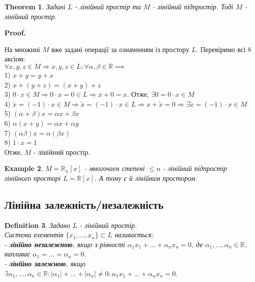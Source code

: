 \documentclass[a4paper, 10pt]{article}
\makeatletter
\def\qed{$\blacksquare$}
\theoremstyle{theoremdd}
\newtheorem{theorem}{Theorem}[subsection]
\theoremstyle{theoremdd}
\newtheorem{definition}[theorem]{Definition}
\theoremstyle{theoremdd}
\theoremstyle{theoremdd}
\newtheorem{example}[theorem]{Example}
\theoremstyle{theoremdd}
\theoremstyle{theoremdd}
\theoremstyle{theoremdd}
\theoremstyle{theoremdd}
\renewenvironment{proof}[1][Proof.\\]{\par
\pushQED{\hfill \qed}%
\normalfont \topsep6\p@\@plus6\p@\relax
\trivlist
\item\relax
{\bfseries
#1\@addpunct{.}}\hspace\labelsep\ignorespaces
}{%
\popQED\endtrivlist\@endpefalse
}
\makeatother
\begin{document}
	\begin{theorem}
	Задані $L$ - лінійний простір та $M$ - лінійний підпростір. Тоді $M$ - лінійний простір.
	\end{theorem}
	
	\begin{proof}
	На множині $M$ вже задані операції за означенням із простору $L$. Перевіримо всі 8 аксіом: \\ $\forall x,y,z \in M \Rightarrow x,y,z \in L: \forall \alpha, \beta \in \mathbb{R} \implies$\\
	1) $x+y=y+x$\\
	2) $x+(y+z)=(x+y)+z$\\
	3) $0\cdot x \in M \Rightarrow 0 \cdot x = 0 \in L \Rightarrow x + 0 = x$. Отже, $\exists 0 = 0 \cdot x \in M$\\
	4) $\tilde{x} = (-1)\cdot x \in M \Rightarrow \tilde{x} = (-1)\cdot x \in L \Rightarrow x + \tilde{x} = 0 \Rightarrow \exists \tilde{x} = (-1)\cdot x \in M$\\
	5) $(\alpha + \beta)x = \alpha x + \beta x$\\
	6) $\alpha (x+y)= \alpha x + \alpha y$\\
	7) $(\alpha \beta) x = \alpha (\beta x)$\\
	8) $1 \cdot x = 1$\\
	Отже, $M$ - лінійний простір.
	\end{proof}

	\begin{example}	
		$M = \mathbb{R}_n[x]$ - многочлен степені $\leq n$ - лінійний підпростір лінійного просторі $L = \mathbb{R}[x]$. А тому є й лінійним простором.
	\end{example}
	
	\subsection{Лінійна залежність/незалежність}
	\begin{definition}
	Задано $L$ - лінійний простір.\\
	Система елементів $\{x_1, \dots, x_n\} \subset L$ називається:\\
	- \textbf{лінійно незалежною}, якщо з рівності $\alpha_1 x_1 + \dots + \alpha_n x_n = 0$, де $\alpha_1, \dots, \alpha_n \in \mathbb{R}$, випливає $\alpha_1 = \dots = \alpha_n = 0$.\\
	- \textbf{лінійно залежною}, якщо $\exists \alpha_1, \dots, \alpha_n \in \mathbb{R}: |\alpha_1| + \dots + |\alpha_n| \neq 0: \alpha_1 x_1 + \dots + \alpha_n x_n = 0$.
	\end{definition}
	
\end{document}
